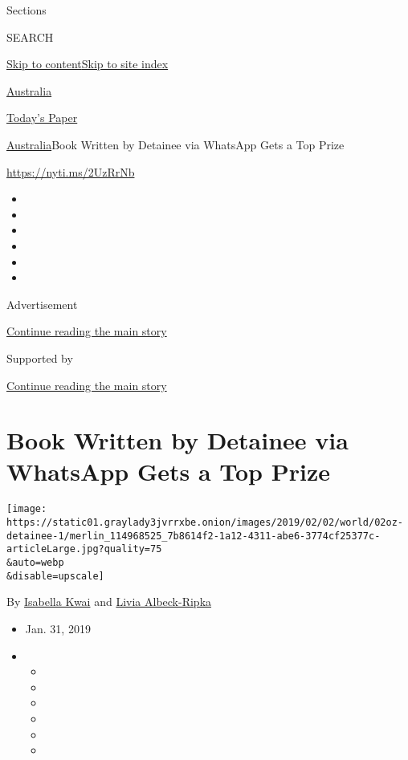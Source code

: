 Sections

SEARCH

\protect\hyperlink{site-content}{Skip to
content}\protect\hyperlink{site-index}{Skip to site index}

\href{https://www.nytimes3xbfgragh.onion/section/world/australia}{Australia}

\href{https://myaccount.nytimes3xbfgragh.onion/auth/login?response_type=cookie\&client_id=vi}{}

\href{https://www.nytimes3xbfgragh.onion/section/todayspaper}{Today's
Paper}

\href{/section/world/australia}{Australia}\textbar{}Book Written by
Detainee via WhatsApp Gets a Top Prize

\url{https://nyti.ms/2UzRrNb}

\begin{itemize}
\item
\item
\item
\item
\item
\item
\end{itemize}

Advertisement

\protect\hyperlink{after-top}{Continue reading the main story}

Supported by

\protect\hyperlink{after-sponsor}{Continue reading the main story}

\hypertarget{book-written-by-detainee-via-whatsapp-gets-a-top-prize}{%
\section{Book Written by Detainee via WhatsApp Gets a Top
Prize}\label{book-written-by-detainee-via-whatsapp-gets-a-top-prize}}

\texttt{[image: https://static01.graylady3jvrrxbe.onion/images/2019/02/02/world/02oz-detainee-1/merlin\_114968525\_7b8614f2-1a12-4311-abe6-3774cf25377c-articleLarge.jpg?quality=75\\\&auto=webp\\\&disable=upscale]}

By \href{https://www.nytimes3xbfgragh.onion/by/isabella-kwai}{Isabella
Kwai} and
\href{https://www.nytimes3xbfgragh.onion/by/livia-albeck-ripka}{Livia
Albeck-Ripka}

\begin{itemize}
\item
  Jan. 31, 2019
\item
  \begin{itemize}
  \item
  \item
  \item
  \item
  \item
  \item
  \end{itemize}
\end{itemize}

